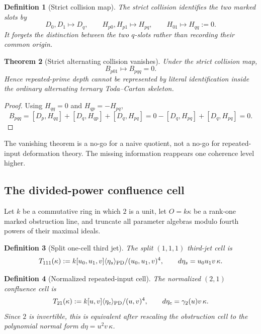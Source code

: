 \documentclass[11pt]{article}
\newtheorem{theorem}{Theorem}[section]
\newtheorem{definition}[theorem]{Definition}
\theoremstyle{remark}
\begin{document}
\begin{definition}[Strict collision map]
The strict collision identifies the two marked slots by
\[
 D_0,D_1\longmapsto D_q,
 \qquad
 H_{p0},H_{p1}\longmapsto H_{pq},
 \qquad
 H_{01}\longmapsto H_{qq}:=0.
\]
It forgets the distinction between the two $q$-slots rather than recording their common origin.
\end{definition}

\begin{theorem}[Strict alternating collision vanishes]\label{P1C-thm:strict-collision-vanishes}
Under the strict collision map,
\[
 B_{p01}\longmapsto B_{pqq}=0.
\]
Hence repeated-prime depth cannot be represented by literal identification inside the ordinary alternating ternary Toda--Cartan skeleton.
\end{theorem}

\begin{proof}
Using $H_{qq}=0$ and $H_{qp}=-H_{pq}$,
\[
 B_{pqq}
 =[D_p,H_{qq}]+[D_q,H_{qp}]+[D_q,H_{pq}]
 =0-[D_q,H_{pq}]+[D_q,H_{pq}]=0.
\]
\end{proof}

The vanishing theorem is a no-go for a naive quotient, not a no-go for repeated-input deformation theory.  The missing information reappears one coherence level higher.

\subsection{The divided-power confluence cell}
Let $k$ be a commutative ring in which $2$ is a unit, let $O=k\kappa$ be a rank-one marked obstruction line, and truncate all parameter algebras modulo fourth powers of their maximal ideals.

\begin{definition}[Split one-cell third jet]
The split $(1,1,1)$ third-jet cell is
\[
 T_{111}(\kappa)
 :=k[u_0,u_1,v]\langle\eta_s\rangle_{\rm PD}/(u_0,u_1,v)^4,
 \qquad
 d\eta_s=u_0u_1v\,\kappa.
\]
\end{definition}

\begin{definition}[Normalized repeated-input cell]
The normalized $(2,1)$ confluence cell is
\[
 T_{21}(\kappa)
 :=k[u,v]\langle\eta_c\rangle_{\rm PD}/(u,v)^4,
 \qquad
 d\eta_c=\gamma_2(u)v\,\kappa.
\]
Since $2$ is invertible, this is equivalent after rescaling the obstruction cell to the polynomial normal form $d\eta=u^2v\,\kappa$.
\end{definition}
\end{document}
